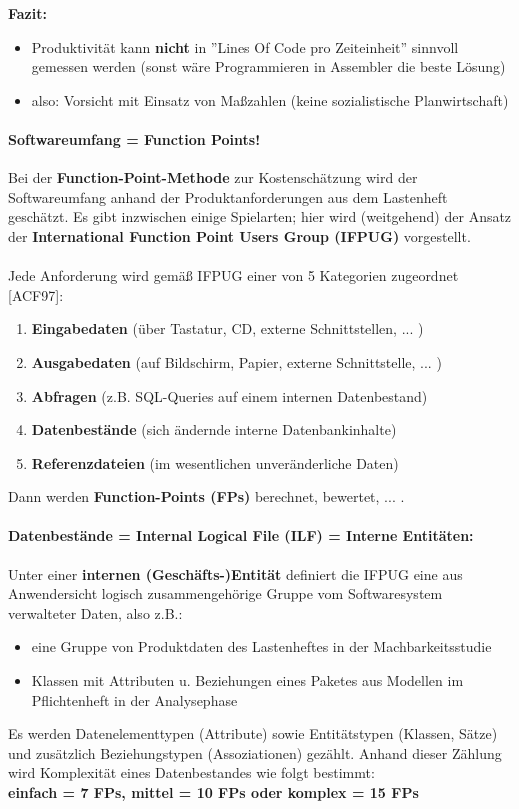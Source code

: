 \textbf{Fazit:}
\begin{itemize}
	\item Produktivität kann \textbf{nicht} in ''Lines Of Code pro Zeiteinheit'' sinnvoll gemessen werden (sonst wäre Programmieren in Assembler die beste Lösung)
	\item also: Vorsicht mit Einsatz von Maßzahlen (keine sozialistische Planwirtschaft)
\end{itemize}

\paragraph{Softwareumfang = Function Points!}
Bei der \textbf{Function-Point-Methode} zur Kostenschätzung wird der Softwareumfang anhand der Produktanforderungen aus dem Lastenheft geschätzt. Es gibt inzwischen einige Spielarten; hier wird (weitgehend) der Ansatz der \textbf{International Function Point Users Group (IFPUG)} vorgestellt.
\\
\\
Jede Anforderung wird gemäß IFPUG einer von 5 Kategorien zugeordnet [ACF97]:
\begin{enumerate}
	\item \textbf{Eingabedaten} (über Tastatur, CD, externe Schnittstellen, ... )
	\item \textbf{Ausgabedaten} (auf Bildschirm, Papier, externe Schnittstelle, ... )
	\item \textbf{Abfragen} (z.B. SQL-Queries auf einem internen Datenbestand)
	\item \textbf{Datenbestände} (sich ändernde interne Datenbankinhalte)
	\item \textbf{Referenzdateien} (im wesentlichen unveränderliche Daten)
\end{enumerate}
Dann werden \textbf{Function-Points (FPs)} berechnet, bewertet, ... .

\paragraph{Datenbestände = Internal Logical File (ILF) = Interne Entitäten:}
Unter einer \textbf{internen (Geschäfts-)Entität} definiert die IFPUG eine aus Anwendersicht logisch zusammengehörige Gruppe vom Softwaresystem verwalteter Daten, also z.B.:
\begin{itemize}
	\item eine Gruppe von Produktdaten des Lastenheftes in der Machbarkeitsstudie
	\item Klassen mit Attributen u. Beziehungen eines Paketes aus Modellen im Pflichtenheft in der Analysephase
\end{itemize}
Es werden Datenelementtypen (Attribute) sowie Entitätstypen (Klassen, Sätze) und zusätzlich Beziehungstypen (Assoziationen) gezählt. Anhand  dieser Zählung wird Komplexität eines Datenbestandes wie folgt bestimmt: \\
\textbf{einfach = 7 FPs, mittel = 10 FPs oder komplex = 15 FPs}

